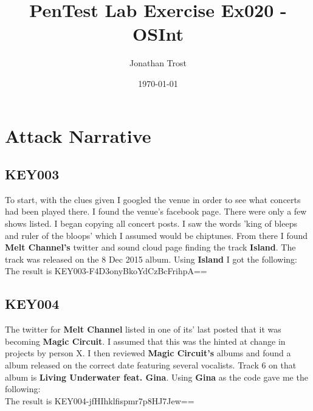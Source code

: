 \documentclass[notitlepage]{article}
\begin{document}
	
	
	\title{PenTest Lab Exercise Ex020 - OSInt}
	\author{Jonathan Trost}
	\date{\isodate\today}
	
	\maketitle
	
	\tableofcontents
	
	\newpage
	\section{Attack Narrative}
	
	\subsection{KEY003}
	To start, with the clues given I googled the venue in order to see what concerts had been played there. I found the venue's facebook page. There were only a few shows listed. I began copying all concert posts.  I saw the words 'king of bleeps and ruler of the bloops' which I assumed would be chiptunes.  From there I found \textbf{Melt Channel's} twitter and sound cloud page finding the track \textbf{Island}. The track was released on the 8 Dec 2015 album. Using \textbf{Island} I got the following:   \\
	The result is KEY003-F4D3onyBkoYdCzBcFrihpA== \\
 
	\subsection{KEY004}
	The twitter for \textbf{Melt Channel} listed in one of its' last posted that it was becoming \textbf{Magic Circuit}. I assumed that this was the hinted at change in projects by person X. I then reviewed \textbf{Magic Circuit's} albums and found a album released on the correct date featuring several vocalists. Track 6 on that album is \textbf{Living Underwater feat. Gina}.  Using \textbf{Gina} as the code gave me the following: \\
	The result is KEY004-jfHIhklfispmr7p8HJ7Jew== \\
	
\end{document}
